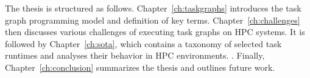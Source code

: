 The thesis is structured as follows. Chapter~\ref{ch:taskgraphs} introduces the task graph
programming model and definition of key terms. Chapter~\ref{ch:challenges} then discusses
various challenges of executing task graphs on HPC systems. It is followed by
Chapter~\ref{ch:sota}, which contains a taxonomy of selected task runtimes and analyses
their behavior in HPC environments. . Finally, Chapter~\ref{ch:conclusion}
summarizes the thesis and outlines future work.
